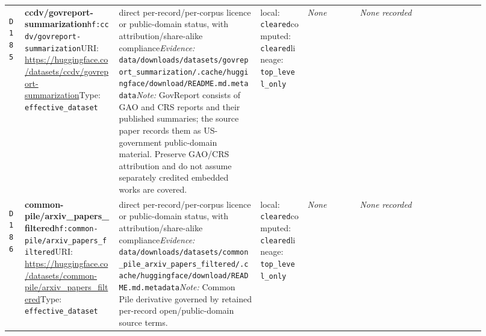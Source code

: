 \documentclass[9pt,a4paper]{article}
\newcommand{\depid}[1]{\hypertarget{dep:#1}{\texttt{#1}}}
\begin{document}
\begin{landscape}
\begin{longtable}{@{}L{0.035\linewidth}L{0.185\linewidth}L{0.27\linewidth}L{0.09\linewidth}L{0.10\linewidth}L{0.24\linewidth}@{}}
\depid{D185} & \textbf{ccdv/govreport-summarization}\newline \nolinkurl{hf:ccdv/govreport-summarization}\newline URI: \url{https://huggingface.co/datasets/ccdv/govreport-summarization}\newline Type: \texttt{effective\_dataset} & direct per-record/per-corpus licence or public-domain status, with attribution/share-alike compliance\newline \textit{Evidence:} \nolinkurl{data/downloads/datasets/govreport_summarization/.cache/huggingface/download/README.md.metadata}\newline \textit{Note:} GovReport consists of GAO and CRS reports and their published summaries; the source paper records them as US-government public-domain material. Preserve GAO/CRS attribution and do not assume separately credited embedded works are covered. & local: \texttt{cleared}\newline computed: \texttt{cleared}\newline lineage: \texttt{top\_level\_only} & \textit{None} & \textit{None recorded} \\
\depid{D186} & \textbf{common-pile/arxiv\_papers\_filtered}\newline \nolinkurl{hf:common-pile/arxiv_papers_filtered}\newline URI: \url{https://huggingface.co/datasets/common-pile/arxiv_papers_filtered}\newline Type: \texttt{effective\_dataset} & direct per-record/per-corpus licence or public-domain status, with attribution/share-alike compliance\newline \textit{Evidence:} \nolinkurl{data/downloads/datasets/common_pile_arxiv_papers_filtered/.cache/huggingface/download/README.md.metadata}\newline \textit{Note:} Common Pile derivative governed by retained per-record open/public-domain source terms. & local: \texttt{cleared}\newline computed: \texttt{cleared}\newline lineage: \texttt{top\_level\_only} & \textit{None} & \textit{None recorded} \\

\end{longtable}
\end{landscape}
\end{document}
